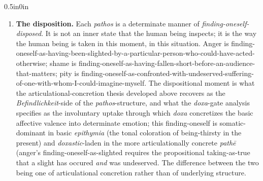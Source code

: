 \documentclass{article}
\begin{document}
\begin{adjustwidth}{0.5in}{0in}
    \begin{enumerate}
        \item \textbf{The disposition.} Each \textit{pathos} is a determinate manner of \textit{finding-oneself-disposed}. It is not an inner state that the human being inspects; it is the way the human being is taken in this moment, in this situation. Anger is finding-oneself-as-having-been-slighted-by-a-particular-person-who-could-have-acted-otherwise; shame is finding-oneself-as-having-fallen-short-before-an-audience-that-matters; pity is finding-oneself-as-confronted-with-undeserved-suffering-of-one-with-whom-I-could-imagine-myself. The dispositional moment is what the articulational-concretion thesis developed above recovers as the \textit{Befindlichkeit}-side of the \textit{pathos}-structure, and what the \textit{doxa}-gate analysis specifies as the involuntary uptake through which \textit{doxa} concretizes the basic affective valence into determinate emotion; this finding-oneself is somatic-dominant in basic \textit{epithymia} (the tonal coloration of being-thirsty in the present) and \textit{doxastic}-laden in the more articulationally concrete \textit{pathē} (anger's finding-oneself-as-slighted requires the propositional taking-as-true that a slight has occured \textit{and} was undeserved. The difference between the two being one of articulational concretion rather than of underlying structure.
        

\end{enumerate}
\end{adjustwidth}
\end{document}
